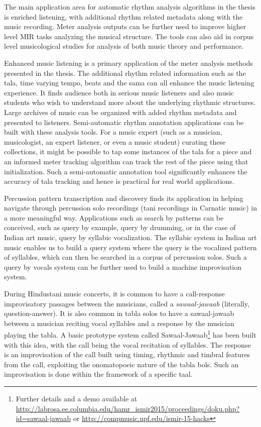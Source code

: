 The main application area for automatic rhythm analysis algorithms in the thesis is enriched listening, with additional rhythm related metadata along with the music recording. Meter analysis outputs can be further used to improve higher level \gls{MIR} tasks analyzing the musical structure. The tools can also aid in corpus level musicological studies for analysis of both music theory and performance. 

Enhanced music listening is a primary application of the meter analysis methods presented in the thesis. The additional rhythm related information such as the \gls{tala}, time varying tempo, beats and the \gls{sama} can all enhance the music listening experience. It finds audience both in serious music listeners and also music students who wish to understand more about the underlying rhythmic structures. Large archives of music can be organized with added rhythm metadata and presented to listeners. Semi-automatic rhythm annotation applications can be built with these analysis tools. For a music expert (such as a musician, musicologist, an expert listener, or even a music student) curating these collections, it might be possible to tap some instances of the \gls{tala} for a piece and an informed meter tracking algorithm can track the rest of the piece using that initialization. Such a semi-automatic annotation tool significantly enhances the accuracy of \gls{tala} tracking and hence is practical for real world applications. 

Percussion pattern transcription and discovery finds its application in helping navigate through percussion solo recordings (\gls{tani} recordings in Carnatic music) in a more meaningful way. Applications such as search by patterns can be conceived, such as query by example, query by drumming, or in the case of Indian art music, query by syllabic vocalization. The syllabic system in Indian art music enables us to build a query system where the query is the vocalized pattern of syllables, which can then be searched in a corpus of percussion solos. Such a query by vocals system can be further used to build a machine improvisation system. 

During Hindustani music concerts, it is common to have a call-response improvisatory passages between the musicians, called a \textit{sawaal-jawaab} (literally, question-answer). It is also common in \gls{tabla} solos to have a sawaal-jawaab between a musician reciting vocal syllables and a response by the musician playing the \gls{tabla}. A basic prototype system called Sawaal-Jawaab\footnote{Further details and a demo available at \url{http://labrosa.ee.columbia.edu/hamr_ismir2015/proceedings/doku.php?id=sawaal-jawaab} or \url{http://compmusic.upf.edu/ismir-15-hacks}} has been built with this idea, with the call being the vocal recitation of syllables. The response is an improvisation of the call built using timing, rhythmic and timbral features from the call, exploiting the onomatopoeic nature of the \gls{tabla} \glspl{bol}. Such an improvisation is done within the framework of a specific \gls{taal}. 

